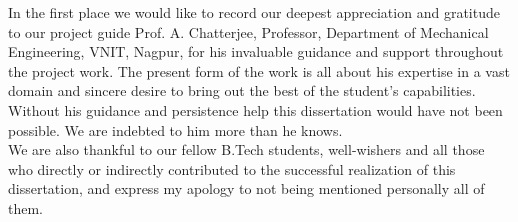 In the first place we would like to record our deepest appreciation and gratitude to our project guide Prof. A. Chatterjee, Professor, Department of Mechanical Engineering, VNIT, Nagpur, for his invaluable guidance and support throughout the project work. The present form of the work is all about his expertise in a vast domain and sincere desire to bring out the best of the student’s capabilities. Without his guidance and persistence help this dissertation would have not been possible. We are indebted to him more than he knows.\\[0.5cm]
We are also thankful to our fellow B.Tech students, well-wishers and all those who directly or indirectly contributed to the successful realization of this dissertation, and express my apology to not being mentioned personally all of them.\\[0.5cm]
%
